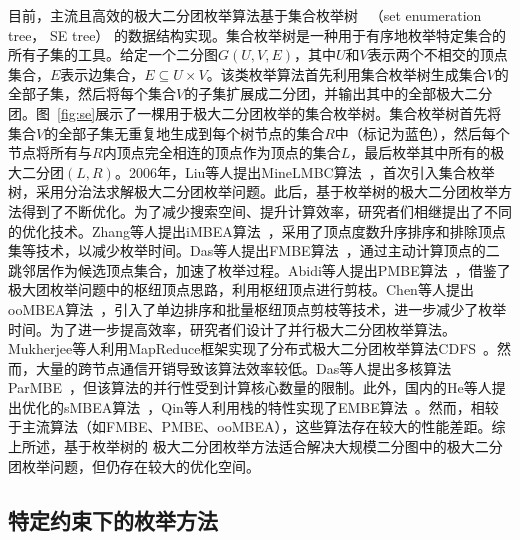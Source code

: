 目前，主流且高效的极大二分团枚举算法基于集合枚举树~\cite{SEtree92} （set enumeration tree， SE tree） 的数据结构实现。集合枚举树是一种用于有序地枚举特定集合的所有子集的工具。给定一个二分图$G(U, V, E)$，其中$U$和$V$表示两个不相交的顶点集合，$E$表示边集合，$E \subseteq U \times V$。该类枚举算法首先利用集合枚举树生成集合$V$的全部子集，然后将每个集合$V$的子集扩展成二分团，并输出其中的全部极大二分团。图~\ref{fig:se}展示了一棵用于极大二分团枚举的集合枚举树。集合枚举树首先将集合$V$的全部子集无重复地生成到每个树节点的集合$R$中（标记为蓝色），然后每个节点将所有与$R$内顶点完全相连的顶点作为顶点的集合$L$，最后枚举其中所有的极大二分团$(L,R)$。2006年，Liu等人提出MineLMBC算法~\cite{minel06}，首次引入集合枚举树，采用分治法求解极大二分团枚举问题。此后，基于枚举树的极大二分团枚举方法得到了不断优化。为了减少搜索空间、提升计算效率，研究者们相继提出了不同的优化技术。Zhang等人提出iMBEA算法~\cite{iMBEA14}，采用了顶点度数升序排序和排除顶点集等技术，以减少枚举时间。Das等人提出FMBE算法~\cite{parMBE18}，通过主动计算顶点的二跳邻居作为候选顶点集合，加速了枚举过程。Abidi等人提出PMBE算法~\cite{PMBE20}，借鉴了极大团枚举问题中的枢纽顶点思路，利用枢纽顶点进行剪枝。Chen等人提出ooMBEA算法~\cite{ooMBE22}，引入了单边排序和批量枢纽顶点剪枝等技术，进一步减少了枚举时间。为了进一步提高效率，研究者们设计了并行极大二分团枚举算法。Mukherjee等人利用MapReduce框架实现了分布式极大二分团枚举算法CDFS~\cite{mapreduceMBE16}。然而，大量的跨节点通信开销导致该算法效率较低。Das等人提出多核算法ParMBE~\cite{parMBE18}，但该算法的并行性受到计算核心数量的限制。此外，国内的He等人提出优化的sMBEA算法~\cite{MBEHe18,MBEchinese19}，Qin等人利用栈的特性实现了EMBE算法~\cite{MBEQin20}。然而，相较于主流算法（如FMBE、PMBE、ooMBEA），这些算法存在较大的性能差距。综上所述，基于枚举树的
极大二分团枚举方法适合解决大规模二分图中的极大二分团枚举问题，但仍存在较大的优化空间。

\subsection{特定约束下的枚举方法}

